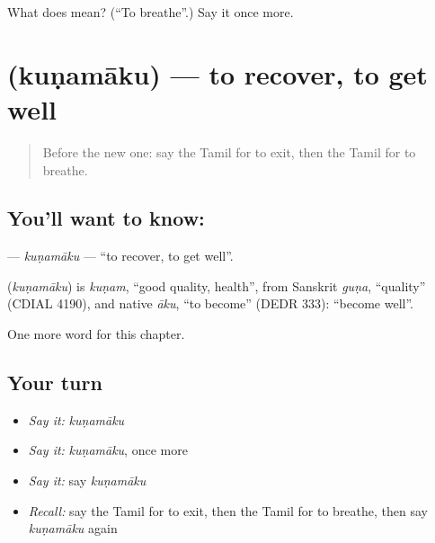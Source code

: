 \begin{tcolorbox}[breakable,colback=teal!4,colframe=teal!35!black,title={Before you move on}]
What does  mean? (\textquotedblleft{}To breathe\textquotedblright{}.) Say it once more.
\end{tcolorbox}
\section[\texorpdfstring{\ta{குணமாகு} (kuṇamāku)}{குணமாகு (kuṇamāku)}]{ (kuṇamāku) — to recover, to get well}

\label{lesson:TA-C255-kunamaku}



\begin{quote}
Before the new one: say the Tamil for to exit, then the Tamil for to breathe.
\end{quote}

\subsection*{You'll want to know: }
\textbf{} — \emph{kuṇamāku} — \textquotedblleft{}to recover, to get well\textquotedblright{}.

\begin{cousinweb}
\textbf{} (\emph{kuṇamāku}) is \emph{kuṇam}, \textquotedblleft{}good quality, health\textquotedblright{}, from Sanskrit \emph{guṇa}, \textquotedblleft{}quality\textquotedblright{} (CDIAL 4190), and native \emph{āku}, \textquotedblleft{}to become\textquotedblright{} (DEDR 333): \textquotedblleft{}become well\textquotedblright{}.
\end{cousinweb}

\begin{grammarlens}[title={What you've built}]
One more word for this chapter.
\end{grammarlens}

\subsection*{Your turn}
\begin{itemize}
\raggedright
  \item \emph{Say it:} \emph{kuṇamāku}
  \item \emph{Say it:} \emph{kuṇamāku}, once more
  \item \emph{Say it:} say \emph{kuṇamāku}
  \item \emph{Recall:} say the Tamil for to exit, then the Tamil for to breathe, then say \emph{kuṇamāku} again
\end{itemize}

